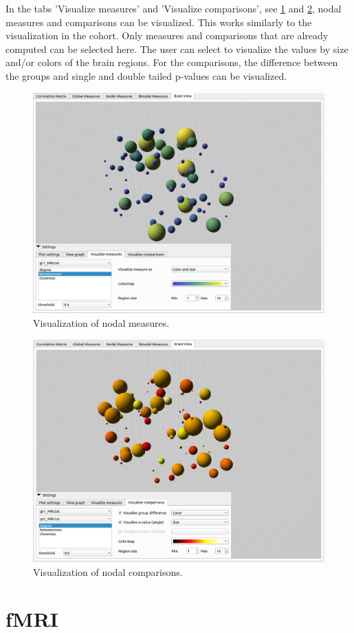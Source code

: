\documentclass{article}
\begin{document}
In the tabs 'Visualize measures' and 'Visualize comparisons', see \cref{fig:measure_vis} and \cref{fig:comparison_vis}, nodal measures and comparisons can be visualized. This works similarly to the visualization in the cohort. Only measures and comparisons that are already computed can be selected here. The user can select to visualize the values by size and/or colors of the brain regions. For the comparisons, the difference between the groups and single and double tailed p-values can be visualized.

\begin{figure}[H]
    \centering
    \includegraphics[width=0.7\linewidth]{measure_vis.png}
    \caption{Visualization of nodal measures.}
    \label{fig:measure_vis}
\end{figure}

\begin{figure}[H]
    \centering
    \includegraphics[width=0.7\linewidth]{comparison_vis.png}
    \caption{Visualization of nodal comparisons.}
    \label{fig:comparison_vis}
\end{figure}

\section{fMRI}
\end{document}
